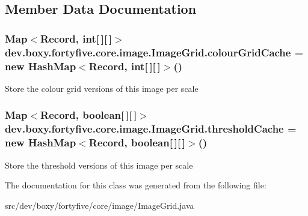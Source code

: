 \subsection{Member Data Documentation}
\hypertarget{classdev_1_1boxy_1_1fortyfive_1_1core_1_1image_1_1_image_grid_ae05f9771d64c7dc730d3e78e6b8652f9}{
\subsubsection[{colourGridCache}]{\setlength{\rightskip}{0pt plus 5cm}Map$<${\bf Record}, int\mbox{[}$\,$\mbox{]}\mbox{[}$\,$\mbox{]}$>$ {\bf dev.boxy.fortyfive.core.image.ImageGrid.colourGridCache} = new HashMap$<${\bf Record}, int\mbox{[}$\,$\mbox{]}\mbox{[}$\,$\mbox{]}$>$()}}
\label{d1/d3a/classdev_1_1boxy_1_1fortyfive_1_1core_1_1image_1_1_image_grid_ae05f9771d64c7dc730d3e78e6b8652f9}
Store the colour grid versions of this image per scale \hypertarget{classdev_1_1boxy_1_1fortyfive_1_1core_1_1image_1_1_image_grid_a1ce05b9ca4d19763d228d5b536b6d456}{
\subsubsection[{thresholdCache}]{\setlength{\rightskip}{0pt plus 5cm}Map$<${\bf Record}, boolean\mbox{[}$\,$\mbox{]}\mbox{[}$\,$\mbox{]}$>$ {\bf dev.boxy.fortyfive.core.image.ImageGrid.thresholdCache} = new HashMap$<${\bf Record}, boolean\mbox{[}$\,$\mbox{]}\mbox{[}$\,$\mbox{]}$>$()}}
\label{d1/d3a/classdev_1_1boxy_1_1fortyfive_1_1core_1_1image_1_1_image_grid_a1ce05b9ca4d19763d228d5b536b6d456}
Store the threshold versions of this image per scale 

The documentation for this class was generated from the following file:\begin{DoxyCompactItemize}
\item 
src/dev/boxy/fortyfive/core/image/ImageGrid.java\end{DoxyCompactItemize}
